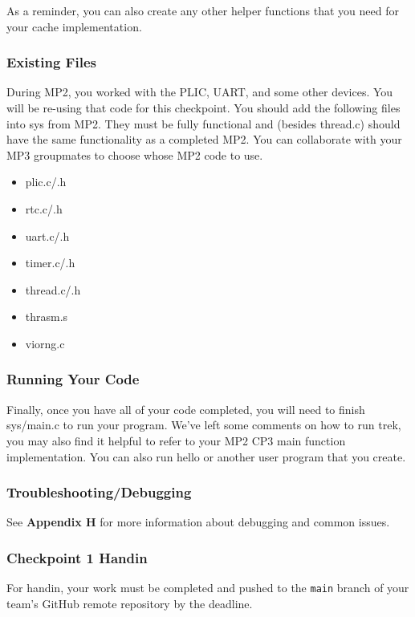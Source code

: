 \documentclass{article}
\begin{document}
	As a reminder, you can also create any other helper functions that you need for your cache implementation.

	\subsubsection{Existing Files}
	During MP2, you worked with the PLIC, UART, and some other devices. You will be re-using
	that code for this checkpoint. You should add the following files into {\fix sys} from MP2.
	They must be fully functional and (besides {\fix thread.c}) should have the same functionality as 
	a completed MP2. You can collaborate with your MP3 groupmates to choose whose MP2 code to use.
	\begin{itemize}
		\item {\fix plic.c/.h}
		\item {\fix rtc.c/.h}
		\item {\fix uart.c/.h}
		\item {\fix timer.c/.h}
		\item {\fix thread.c/.h}
		\item {\fix thrasm.s}
		\item {\fix viorng.c}
	\end{itemize}

	\subsubsection{Running Your Code}
	Finally, once you have all of your code completed, you will need to finish {\fix sys/main.c} to run
	your program. We've left some comments on how to run {\fix trek}, you may also find it helpful to refer 
	to your MP2 CP3 {\fix main} function implementation. You can also run {\fix hello} or another user program
	that you create.

	\subsubsection{Troubleshooting/Debugging}
	See \textbf{Appendix H} for more information about debugging and common issues.
	
	\subsubsection{Checkpoint 1 Handin}
	For handin, your work must be completed and pushed to the \texttt{main} branch of your team's GitHub remote repository by the deadline. 
	
\end{document}
